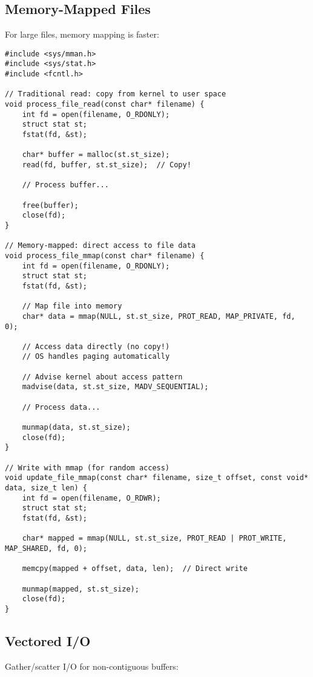 \subsection{Memory-Mapped Files}

For large files, memory mapping is faster:

\begin{lstlisting}
#include <sys/mman.h>
#include <sys/stat.h>
#include <fcntl.h>

// Traditional read: copy from kernel to user space
void process_file_read(const char* filename) {
    int fd = open(filename, O_RDONLY);
    struct stat st;
    fstat(fd, &st);

    char* buffer = malloc(st.st_size);
    read(fd, buffer, st.st_size);  // Copy!

    // Process buffer...

    free(buffer);
    close(fd);
}

// Memory-mapped: direct access to file data
void process_file_mmap(const char* filename) {
    int fd = open(filename, O_RDONLY);
    struct stat st;
    fstat(fd, &st);

    // Map file into memory
    char* data = mmap(NULL, st.st_size, PROT_READ, MAP_PRIVATE, fd, 0);

    // Access data directly (no copy!)
    // OS handles paging automatically

    // Advise kernel about access pattern
    madvise(data, st.st_size, MADV_SEQUENTIAL);

    // Process data...

    munmap(data, st.st_size);
    close(fd);
}

// Write with mmap (for random access)
void update_file_mmap(const char* filename, size_t offset, const void* data, size_t len) {
    int fd = open(filename, O_RDWR);
    struct stat st;
    fstat(fd, &st);

    char* mapped = mmap(NULL, st.st_size, PROT_READ | PROT_WRITE, MAP_SHARED, fd, 0);

    memcpy(mapped + offset, data, len);  // Direct write

    munmap(mapped, st.st_size);
    close(fd);
}
\end{lstlisting}

\subsection{Vectored I/O}

Gather/scatter I/O for non-contiguous buffers:

